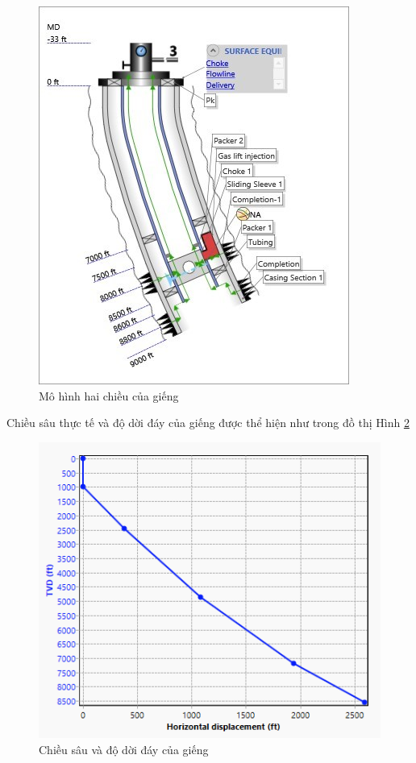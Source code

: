 \documentclass[12pt,a4paper]{report}
\begin{document}
\newpage
	\begin{figure}[h]
		\centering
		\includegraphics[scale=1.1]{Fig/2d_well_model.png}
		\caption{Mô hình hai chiều của giếng}
		\label{fig:2d_well_model}
	\end{figure}
Chiều sâu thực tế và độ dời đáy của giếng được thể hiện như trong đồ thị Hình \ref{fig:hd_directional_drilling}

\newpage
	\begin{figure}[h]
		\centering
		\includegraphics[scale=1.1]{Fig/hd_directional_drilling.PNG}
		\caption{Chiều sâu và độ dời đáy của giếng}
		\label{fig:hd_directional_drilling}
	\end{figure}
\end{document}
